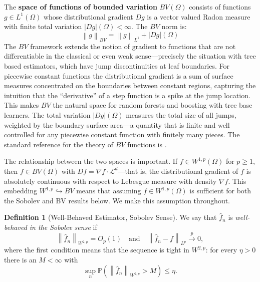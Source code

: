 \documentclass[12pt,a4paper]{article}
\numberwithin{equation}{section}
\theoremstyle{plain}
\theoremstyle{definition}
\newtheorem{definition}{Definition}
\newcommand{\norm}[1]{\left\| #1 \right\|}
\newcommand{\Lone}{L^1(\Omega)}
\newcommand{\Wonep}{W^{1,p}(\Omega)}
\newcommand{\BV}{BV(\Omega)}
\newcommand{\fn}{\hat{f}_n}
\newcommand{\xrightarrowp}{\xrightarrow{p}}
\newcommand{\Prob}{\mathbb{P}}
\begin{document}
	The \textbf{space of functions of bounded variation} $\BV$ consists of functions
	$g \in \Lone$ whose distributional gradient $Dg$ is a vector valued Radon measure
	with finite total variation $|Dg|(\Omega) < \infty$. The $BV$ norm is:
	\begin{equation}
		\norm{g}_{BV} = \norm{g}_{L^1} + |Dg|(\Omega)
	\end{equation}
	The $BV$ framework extends the notion of gradient to functions that are not
	differentiable in the classical or even weak sense---precisely the situation with
	tree based estimators, which have jump discontinuities at leaf boundaries. For
	piecewise constant functions the distributional gradient is a sum of surface measures
	concentrated on the boundaries between constant regions, capturing the intuition that
	the ``derivative'' of a step function is a spike at the jump location. This makes
	$BV$ the natural space for random forests and boosting with tree base learners. The
	total variation $|Dg|(\Omega)$ measures the total size of all jumps, weighted by the
	boundary surface area---a quantity that is finite and well controlled for any
	piecewise constant function with finitely many pieces. The standard reference for
	the theory of $BV$ functions is \citet{ambrosio2000bv}.
	
	The relationship between the two spaces is important. If $f \in \Wonep$ for
	$p \geq 1$, then $f \in \BV$ with $Df = \nabla f \cdot \mathcal{L}^d$---that is,
	the distributional gradient of $f$ is absolutely continuous with respect to Lebesgue
	measure with density $\nabla f$. This embedding $W^{1,p} \hookrightarrow BV$ means
	that assuming $f \in \Wonep$ is sufficient for both the Sobolev and BV results below.
	We make this assumption throughout.
	
	\begin{definition}[Well-Behaved Estimator, Sobolev Sense]
		\label{def:wellbehaved_sobolev}
		We say that $\fn$ is \emph{well-behaved in the Sobolev sense} if
		\begin{equation}
			\norm{\fn}_{W^{2,p}} = O_p(1) \quad \text{and} \quad
			\norm{\fn - f}_{L^p} \xrightarrowp 0 ,
			\label{eq:wb_sobolev}
		\end{equation}
		where the first condition means that the sequence is tight in
		$W^{2,p}$: for every $\eta > 0$ there is an $M < \infty$ with
		\begin{equation}
			\sup_n \Prob\!\left(\norm{\fn}_{W^{2,p}} > M\right) \leq \eta .
			\label{eq:tight_sobolev}
		\end{equation}
	\end{definition}
	
\end{document}
